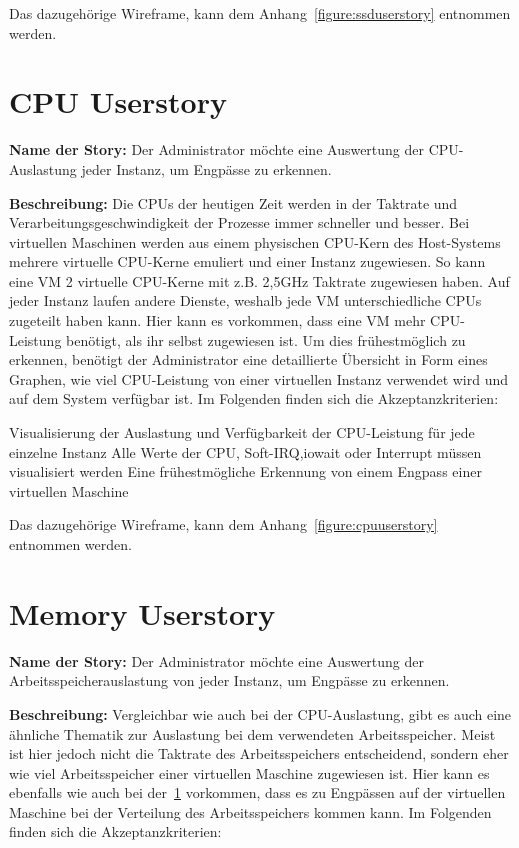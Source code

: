 Das dazugehörige Wireframe, kann dem Anhang~\ref{figure:ssduserstory} entnommen
werden.
\mr%

\section{CPU Userstory}
\label{section:CPU_Userstory}
\textbf{Name der Story:} Der Administrator möchte eine Auswertung der
CPU\hyp{}Auslastung jeder Instanz, um Engpässe zu erkennen.

\textbf{Beschreibung:} Die CPUs der heutigen Zeit werden in der Taktrate und
Verarbeitungsgeschwindigkeit der Prozesse immer schneller und besser. Bei
virtuellen Maschinen werden aus einem physischen CPU\hyp{}Kern des
Host\hyp{}Systems mehrere virtuelle CPU\hyp{}Kerne emuliert und einer Instanz
zugewiesen. So kann eine VM 2 virtuelle CPU\hyp{}Kerne mit z.B.
2,5\si{\giga\hertz} Taktrate zugewiesen haben. Auf jeder Instanz laufen andere
Dienste, weshalb jede VM unterschiedliche CPUs zugeteilt haben kann. Hier kann
es vorkommen, dass eine VM mehr CPU\hyp{}Leistung benötigt, als ihr selbst
zugewiesen ist. Um dies frühestmöglich zu erkennen, benötigt der Administrator
eine detaillierte Übersicht in Form eines Graphen, wie viel CPU\hyp{}Leistung
von einer virtuellen Instanz verwendet wird und auf dem System verfügbar ist.
Im Folgenden finden sich die Akzeptanzkriterien:

\begin{outline}
  \1 Visualisierung der Auslastung und Verfügbarkeit der CPU\hyp{}Leistung für
  jede einzelne Instanz
  \1 Alle Werte der CPU, \gls{Soft-IRQ},\gls{iowait} oder \gls{Interrupt}
  müssen visualisiert werden
  \1 Eine frühestmögliche Erkennung von einem Engpass einer virtuellen Maschine
\end{outline}

Das dazugehörige Wireframe, kann dem Anhang~\ref{figure:cpuuserstory} entnommen
werden.
\mr%

\section{Memory Userstory}
\textbf{Name der Story:} Der Administrator möchte eine Auswertung der
Arbeitsspeicherauslastung von jeder Instanz, um Engpässe zu erkennen.

\textbf{Beschreibung:} Vergleichbar wie auch bei der CPU\hyp{}Auslastung, gibt
es auch eine ähnliche Thematik zur Auslastung bei dem verwendeten
Arbeitsspeicher.  Meist ist hier jedoch nicht die Taktrate des Arbeitsspeichers
entscheidend, sondern eher wie viel Arbeitsspeicher einer virtuellen Maschine
zugewiesen ist.  Hier kann es ebenfalls wie auch bei
der~\ref{section:CPU_Userstory} vorkommen, dass es zu Engpässen auf der
virtuellen Maschine bei der Verteilung des Arbeitsspeichers kommen kann. Im
Folgenden finden sich die Akzeptanzkriterien:

